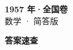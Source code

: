 \documentclass[zihao=-4, a4paper]{ctexart}
\begin{document}
\begin{center}
  {\Large\bfseries 1957 年·全国卷}\\[4pt]
  {\large 数学 · 简答版}
\end{center}
\medskip
{}

\clearpage
{}
\begin{center}{\Large\bfseries 答案速查}\end{center}
\medskip

\end{document}
